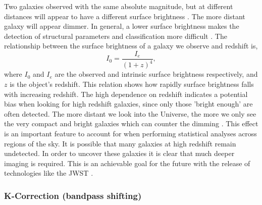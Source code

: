 \documentclass[fleqn,usenatbib]{mnras}
\begin{document}
Two galaxies observed with the same absolute magnitude, but at different distances will appear to have a different surface brightness \citep{Ferreira2018}. The more distant galaxy will appear dimmer. In general, a lower surface brightness makes the detection of structural parameters and classification more difficult \citep{Barden2008}. The relationship between the surface brightness of a galaxy we observe and redshift is,
\begin{equation}
\label{surf_bright}
    I_0 = \frac{I_e}{(1+z)^4},
\end{equation}
where $I_0$ and $I_e$ are the observed and intrinsic surface brightness respectively, and $z$ is the object’s redshift. This relation shows how rapidly surface brightness falls with increasing redshift. The high dependence on redshift indicates a potential bias when looking for high redshift galaxies, since only those 'bright enough' are often detected. The more distant we look into the Universe, the more we only see the very compact and bright galaxies which can counter the dimming \citep{Ferreira2018}. This effect is an important feature to account for when performing statistical analyses across regions of the sky. It is possible that many galaxies at high redshift remain undetected. In order to uncover these galaxies it is clear that much deeper imaging is required. This is an achievable goal for the future with the release of technologies like the JWST \citep{Whitney2020}.

\subsubsection{K-Correction (bandpass shifting)}
\label{sec:bandpass}
\end{document}
